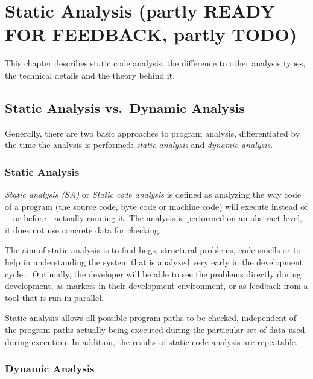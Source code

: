 \chapter{Static Analysis (partly READY FOR FEEDBACK, partly TODO)}
\label{static-analysis}

This chapter describes static code analysis, the difference to other analysis types, the technical details and the theory behind it.

\section{Static Analysis vs.~Dynamic Analysis}

Generally, there are two basic approaches to program analysis, differentiated by the time the analysis is performed: \emph{static analysis} and \emph{dynamic analysis}.

\subsection{Static Analysis}

\emph{Static analysis (SA)} or \emph{Static code analysis} is defined as analyzing the way code of a program (the source code, byte code or machine code) will execute instead of---or before---actually running it. The analysis is performed on an abstract level, \ie it does not use concrete data for checking.~\cite{static-code-analysis}

The aim of static analysis is to find bugs, structural problems, code smells or to help in understanding the system that is analyzed very early in the development cycle.~\cite{data-flow-analysis, chess-west} Optimally, the developer will be able to see the problems directly during development, \eg as markers in their development environment, or as feedback from a tool that is run in parallel.

Static analysis allows all possible program paths to be checked, independent of the program paths actually being executed during the particular set of data used during execution. In addition, the results of static code analysis are repeatable.~\cite{coverity-report}

\subsection{Dynamic Analysis}

